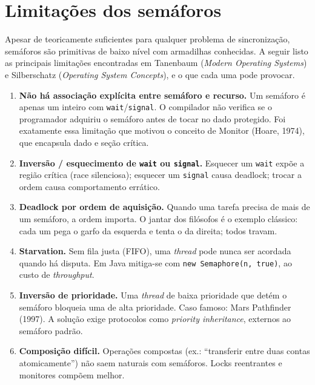 \section{Limitações dos semáforos}

Apesar de teoricamente suficientes para qualquer problema de
sincronização, semáforos são primitivas de baixo nível com armadilhas
conhecidas. A seguir listo as principais limitações encontradas em
Tanenbaum (\textit{Modern Operating Systems}) e Silberschatz
(\textit{Operating System Concepts}), e o que cada uma pode provocar.

\begin{enumerate}[leftmargin=*, itemsep=4pt]

\item \textbf{Não há associação explícita entre semáforo e recurso.}
Um semáforo é apenas um inteiro com \texttt{wait}/\texttt{signal}.
O compilador não verifica se o programador adquiriu o semáforo antes
de tocar no dado protegido. Foi exatamente essa limitação que motivou
o conceito de Monitor (Hoare, 1974), que encapsula dado e seção crítica.

\item \textbf{Inversão / esquecimento de \texttt{wait} ou \texttt{signal}.}
Esquecer um \texttt{wait} expõe a região crítica (race silenciosa);
esquecer um \texttt{signal} causa deadlock; trocar a ordem causa
comportamento errático.

\item \textbf{Deadlock por ordem de aquisição.}
Quando uma tarefa precisa de mais de um semáforo, a ordem importa.
O jantar dos filósofos é o exemplo clássico: cada um pega o garfo da
esquerda e tenta o da direita; todos travam.

\item \textbf{Starvation.}
Sem fila justa (FIFO), uma \textit{thread} pode nunca ser acordada
quando há disputa. Em Java mitiga-se com
\texttt{new Semaphore(n, true)}, ao custo de \textit{throughput}.

\item \textbf{Inversão de prioridade.}
Uma \textit{thread} de baixa prioridade que detém o semáforo bloqueia
uma de alta prioridade. Caso famoso: Mars Pathfinder (1997). A solução
exige protocolos como \textit{priority inheritance}, externos ao
semáforo padrão.

\item \textbf{Composição difícil.}
Operações compostas (ex.: ``transferir entre duas contas atomicamente'')
não saem naturais com semáforos. Locks reentrantes e monitores compõem
melhor.


\end{enumerate}
